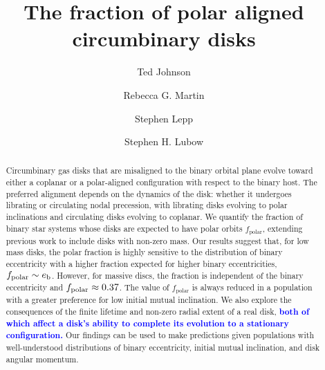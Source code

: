 \documentclass[twocolumn,linenumbers]{aastex631}
\newcommand{\RR}[1]{\textcolor{blue}{\bf#1}} %
\begin{document}
\title{The fraction of polar aligned circumbinary disks}

\author[0000-0002-1570-2203]{Ted Johnson}
\author[0000-0003-2401-7168]{Rebecca G. Martin}
\author[0000-0003-2270-1310]{Stephen Lepp}
\author[0000-0002-4636-7348]{Stephen H. Lubow}

\begin{abstract}

    Circumbinary gas disks that are misaligned to the binary orbital plane evolve toward either a coplanar or a polar-aligned configuration with respect to the binary host. The preferred alignment depends on the dynamics of the disk: whether it undergoes librating or circulating nodal precession, with librating disks evolving to polar inclinations and circulating disks evolving to coplanar.
    We quantify the fraction of binary star systems whose disks are expected to have polar orbits $f_\text{polar}$, extending previous work to include disks with non-zero mass.
    Our results suggest that, for low mass disks, the polar fraction is highly sensitive to the distribution of binary eccentricity with a higher fraction expected for higher binary eccentricities, $f_{\rm polar}\sim e_{\rm b}$. However, for massive discs, the fraction is independent of the binary eccentricity and $f_{\rm polar}\approx 0.37$. The value of $f_\text{polar}$ is always reduced in a population with a greater preference for low initial mutual inclination.
    We also explore the consequences of the finite lifetime and non-zero radial extent of a real disk, \RR{both of which affect a disk's ability to complete its evolution to a stationary configuration.} Our findings can be used to make predictions given populations with well-understood distributions of binary eccentricity, initial mutual inclination, and disk angular momentum.
\end{abstract}
\end{document}
